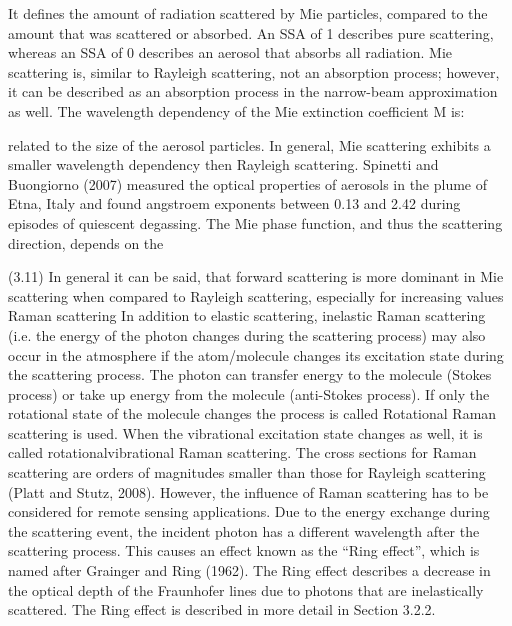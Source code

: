 \documentclass  [
  paper    = a4,
  BCOR     = 10mm,
  twoside,
  fontsize = 12pt,
  fleqn,
  toc      = bibnumbered,
  toc      = listofnumbered,
  numbers  = noendperiod,
  headings = normal,
  listof   = leveldown,
  version  = 3.03
]                                       {scrreprt}
\begin{document}
It defines the amount of radiation scattered by Mie particles, compared to the
amount that was scattered or absorbed. An SSA of 1 describes pure scattering,
whereas an SSA of 0 describes an aerosol that absorbs all radiation.
Mie scattering is, similar to Rayleigh scattering, not an absorption process;
however, it can be described as an absorption process in the narrow-beam
approximation as well. The wavelength dependency of the Mie extinction
coefficient M is:

related to the size of the aerosol particles. In general, Mie scattering exhibits a
smaller wavelength dependency then Rayleigh scattering. Spinetti and Buongiorno
(2007) measured the optical properties of aerosols in the plume of Etna,
Italy and found angstroem exponents between 0.13 and 2.42 during episodes of
quiescent degassing.
The Mie phase function, and thus the scattering direction, depends on the


(3.11)
In general it can be said, that forward scattering is more dominant in Mie
scattering when compared to Rayleigh scattering, especially for increasing values
Raman scattering
In addition to elastic scattering, inelastic Raman scattering (i.e. the energy of the
photon changes during the scattering process) may also occur in the atmosphere
if the atom/molecule changes its excitation state during the scattering process.
The photon can transfer energy to the molecule (Stokes process) or take up energy
from the molecule (anti-Stokes process). If only the rotational state  of
the molecule changes the process is called Rotational Raman scattering is used.
When the vibrational excitation state changes as well, it is called rotationalvibrational
Raman scattering. The cross sections for Raman scattering are orders
of magnitudes smaller than those for Rayleigh scattering (Platt and Stutz, 2008).
However, the influence of Raman scattering has to be considered for remote
sensing applications. Due to the energy exchange during the scattering event,
the incident photon has a different wavelength after the scattering process. This
causes an effect known as the “Ring effect”, which is named after Grainger and
Ring (1962). The Ring effect describes a decrease in the optical depth of the
Fraunhofer lines due to photons that are inelastically scattered. The Ring effect
is described in more detail in Section 3.2.2.
\end{document}
